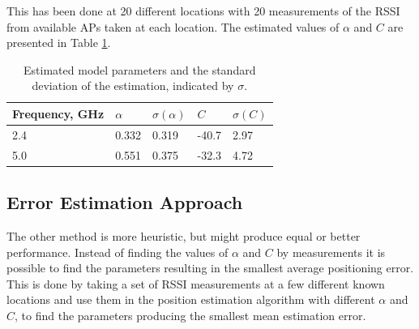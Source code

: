 \documentclass{LTHthesis}
\begin{document}
This has been done at 20 different locations with 20 measurements of the RSSI from available APs taken at each location. The estimated values of $\alpha$ and $C$ are presented in Table \ref{table:est_par}.

\begin{table}[!hbt]
\begin{center}
\begin{tabular}{|l|l|l|l|l|}
\hline
\multicolumn{1}{|c|}{Frequency, GHz} & $\alpha$ & $\sigma(\alpha)$ & $C$ & $\sigma(C)$ \\
\hline
\hline
2.4 & 0.332 & 0.319 & -40.7 & 2.97 \\
5.0 & 0.551 & 0.375 & -32.3 & 4.72  \\
\hline
\end{tabular}
\end{center}
\caption{Estimated model parameters and the standard deviation of the estimation, indicated by $\sigma$.}\label{table:est_par}
\end{table}
%
\subsection{Error Estimation Approach}
The other method is more heuristic, but might produce equal or better performance. Instead of finding the values of $\alpha$ and $C$ by measurements it is possible to find the parameters resulting in the smallest average positioning error. This is done by taking a set of RSSI measurements at a few different known locations and use them in the position estimation algorithm with different $\alpha$ and $C$, to find the parameters producing the smallest mean estimation error.   
\end{document}
